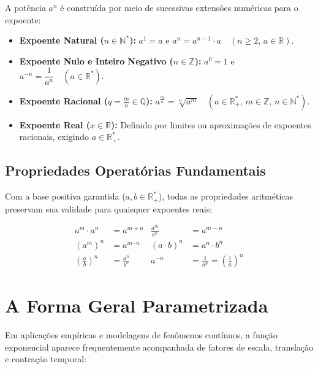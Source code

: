 \documentclass[12pt,a4paper]{report}
\begin{document}
	A potência $a^n$ é construída por meio de sucessivas extensões numéricas para o expoente:
	
	\begin{itemize}
		\item \textbf{Expoente Natural ($n \in \mathbb{N}^*$):} $a^1 = a$ \quad e \quad $a^n = a^{n-1} \cdot a \quad (n \geqslant 2, \, a \in \mathbb{R})$.
		\item \textbf{Expoente Nulo e Inteiro Negativo ($n \in \mathbb{Z}$):} $a^0 = 1$ \quad e \quad $a^{-n} = \dfrac{1}{a^n} \quad (a \in \mathbb{R}^*)$.
		\item \textbf{Expoente Racional ($q = \frac{m}{n} \in \mathbb{Q}$):} $a^{\frac{m}{n}} = \sqrt[n]{a^m} \quad (a \in \mathbb{R}^*_+, \, m \in \mathbb{Z}, \, n \in \mathbb{N}^*)$.
		\item \textbf{Expoente Real ($x \in \mathbb{R}$):} Definido por limites ou aproximações de expoentes racionais, exigindo $a \in \mathbb{R}^*_+$.
	\end{itemize}
	
	\subsection{Propriedades Operatórias Fundamentais}
	
	Com a base positiva garantida ($a, b \in \mathbb{R}^*_+$), todas as propriedades aritméticas preservam sua validade para quaisquer expoentes reais:
	
	\begin{destaque}
		\begin{align*}
			a^m \cdot a^n &= a^{m+n} & \frac{a^m}{a^n} &= a^{m-n} \\[0.3cm]
			(a^m)^n &= a^{m \cdot n} & (a \cdot b)^n &= a^n \cdot b^n \\[0.3cm]
			\left(\frac{a}{b}\right)^n &= \frac{a^n}{b^n} & a^{-n} &= \frac{1}{a^n} = \left(\frac{1}{a}\right)^n
		\end{align*}
	\end{destaque}
	
	\section{A Forma Geral Parametrizada}
	\label{subsec:forma_geral_exp}
	
	Em aplicações empíricas e modelagens de fenômenos contínuos, a função exponencial aparece frequentemente acompanhada de fatores de escala, translação e contração temporal:
	
\end{document}
